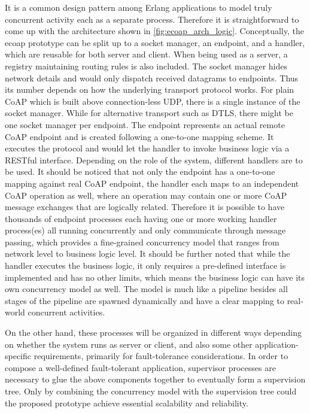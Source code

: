 It is a common design pattern among Erlang applications to model truly concurrent activity each as a separate process. Therefore it is straightforward to come up with the architecture shown in \autoref{fig:ecoap_arch_logic}. Conceptually, the ecoap prototype can be split up to a socket manager, an endpoint, and a handler, which are reusable for both server and client. When being used as a server, a registry maintaining routing rules is also included. The socket manager hides network details and would only dispatch received datagrams to endpoints. Thus its number depends on how the underlying transport protocol works. For plain CoAP which is built above connection-less UDP, there is a single instance of the socket manager. While for alternative transport such as DTLS, there might be one socket manager per endpoint. The endpoint represents an actual remote CoAP endpoint and is created following a one-to-one mapping scheme. It executes the protocol and would let the handler to invoke business logic via a RESTful interface. Depending on the role of the system, different handlers are to be used. It should be noticed that not only the endpoint has a one-to-one mapping against real CoAP endpoint, the handler each maps to an independent CoAP operation as well, where an operation may contain one or more CoAP message exchanges that are logically related. Therefore it is possible to have thousands of endpoint processes each having one or more working handler process(es) all running concurrently and only communicate through message passing, which provides a fine-grained concurrency model that ranges from network level to business logic level. It should be further noted that while the handler executes the business logic, it only requires a pre-defined interface is implemented and has no other limits, which means the business logic can have its own concurrency model as well. The model is much like a pipeline besides all stages of the pipeline are spawned dynamically and have a clear mapping to real-world concurrent activities. 
 
On the other hand, these processes will be organized in different ways depending on whether the system runs as server or client, and also some other application-specific requirements, primarily for fault-tolerance considerations. In order to compose a well-defined fault-tolerant application, supervisor processes are necessary to glue the above components together to eventually form a supervision tree. Only by combining the concurrency model with the supervision tree could the proposed prototype achieve essential scalability and reliability. 

